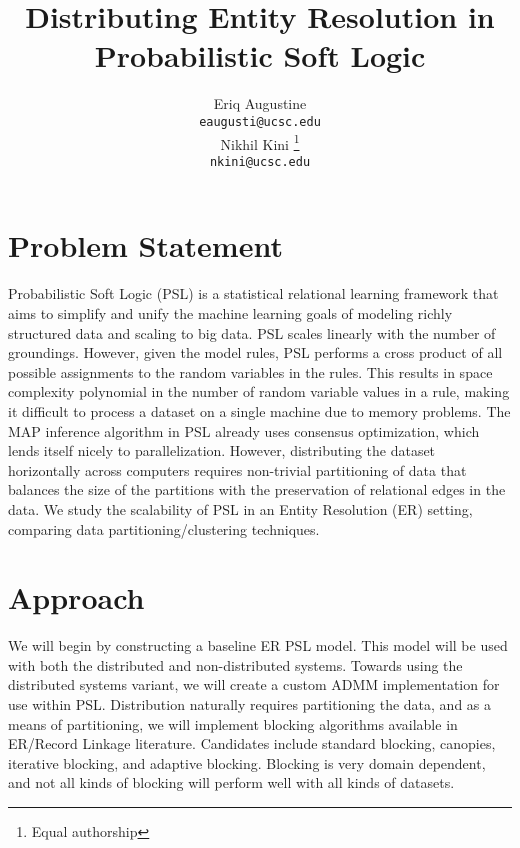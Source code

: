 \documentclass{article}
\title{Distributing Entity Resolution in Probabilistic Soft Logic}
\author{
  Eriq Augustine \\
  \texttt{eaugusti@ucsc.edu} \\
\And
 Nikhil Kini \thanks{Equal authorship} \\
 \texttt{nkini@ucsc.edu} \\
}
\begin{document}

\maketitle

  




\section{Problem Statement}
Probabilistic Soft Logic (PSL) is a statistical relational learning framework that aims to simplify and unify the machine learning goals of modeling richly structured data and scaling to big data. PSL scales linearly with the number of groundings. However, given the model rules, PSL performs a cross product of all possible assignments to the random variables in the rules. This results in space complexity polynomial in the number of random variable values in a rule, making it difficult to process a dataset on a single machine due to memory problems. The MAP inference algorithm in PSL already uses consensus optimization, which lends itself nicely to parallelization. However, distributing the dataset horizontally across computers requires non-trivial partitioning of data that balances the size of the partitions with the preservation of relational edges in the data. We study the scalability of PSL in an Entity Resolution (ER) setting, comparing data partitioning/clustering techniques.

\section{Approach}

We will begin by constructing a baseline ER PSL model. This model will be used with both the distributed and non-distributed systems. Towards using the distributed systems variant, we will create a custom ADMM implementation for use within PSL. Distribution naturally requires partitioning the data, and as a means of partitioning, we will implement blocking algorithms available in ER/Record Linkage literature. Candidates include standard blocking, canopies, iterative blocking, and adaptive blocking. Blocking is very domain dependent, and not all kinds of blocking will perform well with all kinds of datasets.
\end{document}
